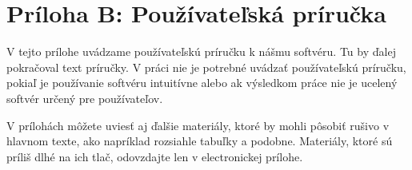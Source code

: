 \chapter*{Príloha B: Používateľská príručka}

V tejto prílohe uvádzame používateľskú príručku k nášmu softvéru. Tu
by ďalej pokračoval text príručky. V práci nie je potrebné uvádzať
používateľskú príručku, pokiaľ je používanie softvéru intuitívne
alebo ak výsledkom práce nie je ucelený softvér určený pre
používateľov.

V prílohách môžete uviesť aj ďalšie materiály, ktoré by mohli pôsobiť
rušivo v hlavnom texte, ako napríklad rozsiahle tabuľky a
podobne. Materiály, ktoré sú príliš dlhé na ich tlač, odovzdajte len v
electronickej prílohe.
